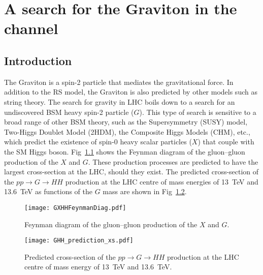 \chapter{A search for the Graviton in the \hhbbtmth channel}
\label{Chapter_Graviton}

\graphicspath{{1_MainChapters/Chap7_GravLimit/figures}{1_MainChapters/Chap7_GravLimit/notMyFigures}}


\section{Introduction}
    \label{sec:grav_intro}
    The Graviton is a spin-2 particle that mediates the gravitational force. 
    In addition to the RS model, the Graviton is also predicted by 
    other models such as string theory.
    The search for gravity in LHC boils down to a search for an undiscovered BSM heavy spin-2 particle ($G$).
    This type of search is sensitive to a broad range of other BSM theory, such as the Supersymmetry (SUSY) model,
    Two-Higgs Doublet Model (2HDM), the Composite Higgs Models (CHM), etc., which predict the existence of  
    spin-0 heavy scalar particles ($X$) that couple with the SM Higgs boson. Fig~\ref{fig:grav} shows the 
    Feynman diagram of the gluon--gluon production of the $X$ and $G$. These production processes are
    predicted to have the largest cross-section at the LHC, should they exist. The predicted cross-section of the
    $pp\rightarrow G\rightarrow HH$ production at the LHC centre of mass energies of 13~TeV and 13.6~TeV as functions of 
    the $G$ mass are shown in Fig~\ref{fig:grav_pred_xs}.
    \begin{figure}[htbp]
        \centering
        \texttt{[image: GXHHFeynmanDiag.pdf]}
        \caption{Feynman diagram of the gluon--gluon production of the $X$ and $G$.}
        \label{fig:grav}
    \end{figure}
    \begin{figure}[htbp]
        \centering
        \texttt{[image: GHH\_prediction\_xs.pdf]}
        \caption{Predicted cross-section of the $pp\rightarrow G\rightarrow HH$ production at the LHC centre of mass energy of 13~TeV and 13.6~TeV.}
        \label{fig:grav_pred_xs}
    \end{figure}


